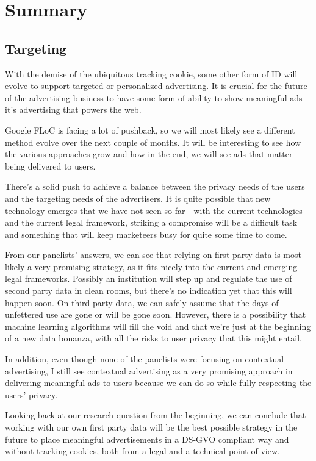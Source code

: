 %
%

\pagebreak
\section{Summary}

\onehalfspacing

\subsection{Targeting}

With the demise of the ubiquitous tracking cookie, some other form of ID will evolve to support targeted or personalized advertising. It is crucial for the future of the advertising business to have some form of ability to show meaningful ads - it's advertising that powers the web.

Google FLoC is facing a lot of pushback, so we will most likely see a different method evolve over the next couple of months. It will be interesting to see how the various approaches grow and how in the end, we will see ads that matter being delivered to users.

There's a solid push to achieve a balance between the privacy needs of the users and the targeting needs of the advertisers. It is quite possible that new technology emerges that we have not seen so far - with the current technologies and the current legal framework, striking a compromise will be a difficult task and something that will keep marketeers busy for quite some time to come.

From our panelists' answers, we can see that relying on first party data is most likely a very promising strategy, as it fits nicely into the current and emerging legal frameworks. Possibly an institution will step up and regulate the use of second party data in clean rooms, but there's no indication yet that this will happen soon. On third party data, we can safely assume that the days of unfettered use are gone or will be gone soon. However, there is a possibility that machine learning algorithms will fill the void and that we're just at the beginning of a new data bonanza, with all the risks to user privacy that this might entail.

In addition, even though none of the panelists were focusing on contextual advertising, I still see contextual advertising as a very promising approach in delivering meaningful ads to users because we can do so while fully respecting the users' privacy.

Looking back at our research question from the beginning, we can conclude that working with our own first party data will be the best possible strategy in the future to place meaningful advertisements in a DS-GVO compliant way and without tracking cookies, both from a legal and a technical point of view.

